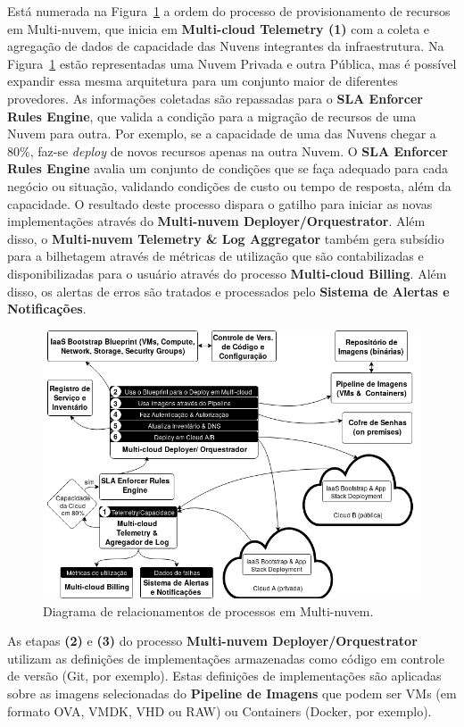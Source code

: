 \documentclass[12pt]{article}
\begin{document}
	Está numerada na Figura~\ref{fig:figure1} a ordem do processo de provisionamento de recursos em Multi-nuvem, que inicia em \textbf{Multi-cloud Telemetry (1)} com a coleta e agregação de dados de capacidade das Nuvens integrantes da infraestrutura. Na Figura~\ref{fig:figure1} estão representadas uma Nuvem Privada e outra Pública, mas é possível expandir essa mesma arquitetura para um conjunto maior de diferentes provedores. As informações coletadas são repassadas para o \textbf{SLA Enforcer Rules Engine}, que valida a condição para a migração de recursos de uma Nuvem para outra. Por exemplo, se a capacidade de uma das Nuvens chegar a 80\%, faz-se \textit{deploy} de novos recursos apenas na outra Nuvem. O \textbf{SLA Enforcer Rules Engine} avalia um conjunto de condições que se faça adequado para cada negócio ou situação, validando condições de custo ou tempo de resposta, além da capacidade. O resultado deste processo dispara o gatilho para iniciar as novas implementações através do \textbf{Multi-nuvem Deployer/Orquestrator}. Além disso, o \textbf{Multi-nuvem Telemetry \& Log Aggregator} também gera subsídio para a bilhetagem através de métricas de utilização que são contabilizadas e disponibilizadas para o usuário através do processo \textbf{Multi-cloud Billing}. Além disso, os alertas de erros são tratados e processados pelo \textbf{Sistema de Alertas e Notificações}.
		
	\begin{figure}[H]
		\centering
		\includegraphics[width=0.9\linewidth]{figuras/Figure1.png}
		\caption{Diagrama de relacionamentos de processos em Multi-nuvem.}
		\label{fig:figure1}
	\end{figure}

	 As etapas \textbf{(2)} e \textbf{(3)} do processo \textbf{Multi-nuvem Deployer/Orquestrator} utilizam as definições de implementações armazenadas como código em controle de versão (Git, por exemplo). Estas definições de implementações são aplicadas sobre as imagens selecionadas do \textbf{Pipeline de Imagens} que podem ser VMs (em formato OVA, VMDK, VHD ou RAW) ou Containers (Docker, por exemplo).
	
\end{document}
